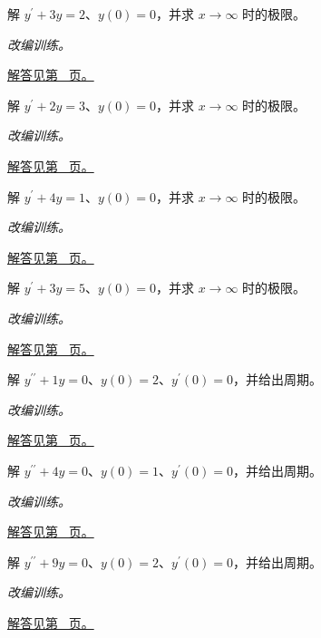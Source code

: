 \documentclass[UTF8,12pt,a4paper,fontset=fandol]{ctexart}
\begin{document}
\begin{example}[积分因子解线性方程]\label{ex:c22q15}
解 $y^{\prime}+3y=2$、$y(0)=0$，并求 $x\to\infty$ 时的极限。
\par\textit{改编训练。}\par\hyperref[ans:c22q15]{解答见第~\pageref{ans:c22q15} 页。}
\end{example}
\begin{example}[积分因子解线性方程]\label{ex:c22q16}
解 $y^{\prime}+2y=3$、$y(0)=0$，并求 $x\to\infty$ 时的极限。
\par\textit{改编训练。}\par\hyperref[ans:c22q16]{解答见第~\pageref{ans:c22q16} 页。}
\end{example}
\begin{example}[积分因子解线性方程]\label{ex:c22q17}
解 $y^{\prime}+4y=1$、$y(0)=0$，并求 $x\to\infty$ 时的极限。
\par\textit{改编训练。}\par\hyperref[ans:c22q17]{解答见第~\pageref{ans:c22q17} 页。}
\end{example}
\begin{example}[积分因子解线性方程]\label{ex:c22q18}
解 $y^{\prime}+3y=5$、$y(0)=0$，并求 $x\to\infty$ 时的极限。
\par\textit{改编训练。}\par\hyperref[ans:c22q18]{解答见第~\pageref{ans:c22q18} 页。}
\end{example}
\begin{example}[简谐振动初值问题]\label{ex:c22q19}
解 $y^{\prime\prime}+1y=0$、$y(0)=2$、$y^{\prime}(0)=0$，并给出周期。
\par\textit{改编训练。}\par\hyperref[ans:c22q19]{解答见第~\pageref{ans:c22q19} 页。}
\end{example}
\begin{example}[简谐振动初值问题]\label{ex:c22q20}
解 $y^{\prime\prime}+4y=0$、$y(0)=1$、$y^{\prime}(0)=0$，并给出周期。
\par\textit{改编训练。}\par\hyperref[ans:c22q20]{解答见第~\pageref{ans:c22q20} 页。}
\end{example}
\begin{example}[简谐振动初值问题]\label{ex:c22q21}
解 $y^{\prime\prime}+9y=0$、$y(0)=2$、$y^{\prime}(0)=0$，并给出周期。
\par\textit{改编训练。}\par\hyperref[ans:c22q21]{解答见第~\pageref{ans:c22q21} 页。}
\end{example}
\end{document}
